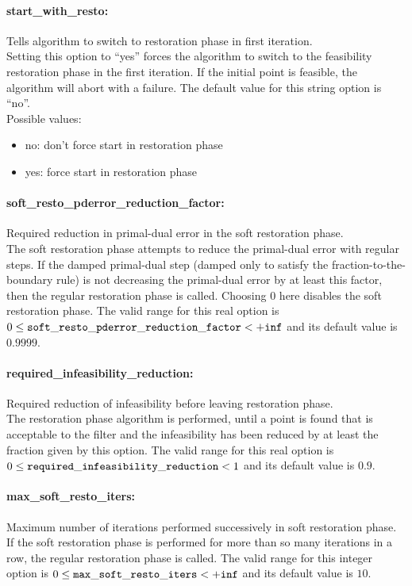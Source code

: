 \paragraph{start\_with\_resto:} Tells algorithm to switch to restoration phase in first iteration. $\;$ \\
 Setting this option to ``yes'' forces the algorithm
to switch to the feasibility restoration phase in
the first iteration. If the initial point is
feasible, the algorithm will abort with a failure.
The default value for this string option is ``no''.
\\ 
Possible values:
\begin{itemize}
   \item no: don't force start in restoration phase
   \item yes: force start in restoration phase
\end{itemize}

\paragraph{soft\_resto\_pderror\_reduction\_factor:} Required reduction in primal-dual error in the soft restoration phase. $\;$ \\
 The soft restoration phase attempts to reduce the
primal-dual error with regular steps. If the
damped primal-dual step (damped only to satisfy
the fraction-to-the-boundary rule) is not
decreasing the primal-dual error by at least this
factor, then the regular restoration phase is
called. Choosing 0 here disables the soft
restoration phase. The valid range for this real option is 
$0 \le {\tt soft\_resto\_pderror\_reduction\_factor } <  {\tt +inf}$
and its default value is $0.9999$.


\paragraph{required\_infeasibility\_reduction:} Required reduction of infeasibility before leaving restoration phase. $\;$ \\
 The restoration phase algorithm is performed,
until a point is found that is acceptable to the
filter and the infeasibility has been reduced by
at least the fraction given by this option. The valid range for this real option is 
$0 \le {\tt required\_infeasibility\_reduction } <  1$
and its default value is $0.9$.


\paragraph{max\_soft\_resto\_iters:} Maximum number of iterations performed successively in soft restoration phase. $\;$ \\
 If the soft restoration phase is performed for
more than so many iterations in a row, the regular
restoration phase is called. The valid range for this integer option is
$0 \le {\tt max\_soft\_resto\_iters } <  {\tt +inf}$
and its default value is $10$.


